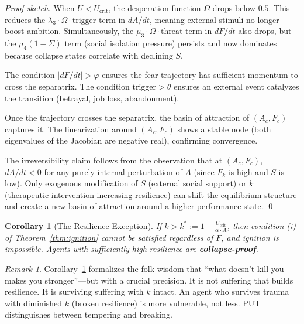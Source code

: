 \documentclass[12pt, a4paper]{article}
\newtheorem{corollary}{Corollary}[section]
\theoremstyle{remark}
\newtheorem{remark}{Remark}[section]
\newcommand{\Ucrit}{U_{\text{crit}}}
\newcommand{\Fk}{F_k}
\begin{document}
\begin{proof}[Proof sketch]
When $U < \Ucrit$, the desperation function $\Omega$ drops below $0.5$.
This reduces the $\lambda_3 \cdot \Omega \cdot \text{trigger}$ term in
$dA/dt$, meaning external stimuli no longer boost ambition. Simultaneously,
the $\mu_3 \cdot \Omega \cdot \text{threat}$ term in $dF/dt$ also drops,
but the $\mu_4 (1 - \Sigma)$ term (social isolation pressure) persists
and now dominates because collapse states correlate with declining $S$.

The condition $|dF/dt| > \varphi$ ensures the fear trajectory has
sufficient momentum to cross the separatrix. The condition
$\text{trigger} > \theta$ ensures an external event catalyzes the
transition (betrayal, job loss, abandonment).

Once the trajectory crosses the separatrix, the basin of attraction of
$(A_c, F_c)$ captures it. The linearization around $(A_c, F_c)$ shows
a stable node (both eigenvalues of the Jacobian are negative real),
confirming convergence.

The irreversibility claim follows from the observation that at
$(A_c, F_c)$, $dA/dt < 0$ for any purely internal perturbation
of $A$ (since $\Fk$ is high and $S$ is low). Only exogenous
modification of $S$ (external social support) or $k$ (therapeutic
intervention increasing resilience) can shift the equilibrium
structure and create a new basin of attraction around a
higher-performance state. \qed
\end{proof}

\begin{corollary}[The Resilience Exception]\label{cor:resilience}
If $k > k^* := 1 - \frac{\Ucrit}{\alpha \cdot A}$, then condition (i)
of Theorem~\ref{thm:ignition} cannot be satisfied regardless of $F$,
and ignition is impossible. Agents with sufficiently high resilience
are \textbf{collapse-proof}.
\end{corollary}

\begin{remark}
Corollary~\ref{cor:resilience} formalizes the folk wisdom that ``what
doesn't kill you makes you stronger''---but with a crucial precision.
It is not suffering that builds resilience. It is surviving suffering
with $k$ intact. An agent who survives trauma with diminished $k$
(broken resilience) is more vulnerable, not less. PUT distinguishes
between tempering and breaking.
\end{remark}

\end{document}
